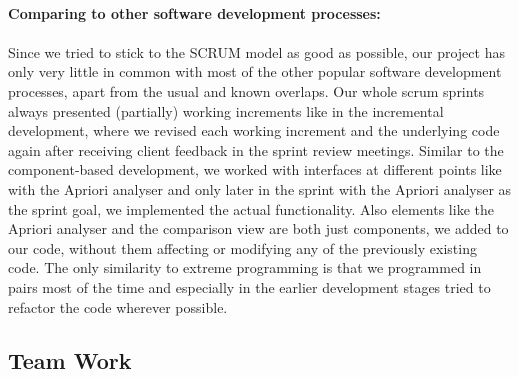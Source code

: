 \ \\
{\large\textbf{Comparing to other software development processes:}}\\ 
\ \\
Since we tried to stick to the SCRUM model as good as possible, our project has only very little in common with most of the other popular software development processes, apart from the usual and known overlaps. Our whole scrum sprints always presented (partially) working increments like in the incremental development, where we revised each working increment and the underlying code again after receiving client feedback in the sprint review meetings. Similar to the component-based development, we worked with interfaces at different points like with the Apriori analyser and only later in the sprint with the Apriori analyser as the sprint goal, we implemented the actual functionality. Also elements like the Apriori analyser and the comparison view are both just components, we added to our code, without them affecting or modifying any of the previously existing code. The only similarity to extreme programming is that we programmed in pairs most of the time and especially in the earlier development stages tried to refactor the code wherever possible.\\


\subsection{Team Work}

